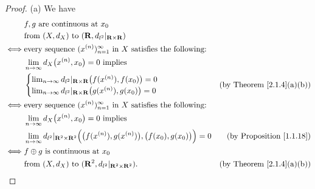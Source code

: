 \begin{proof}{(a)}
    We have
    \begin{align*}
             & f, g \text{ are continuous at } x_0                                                                                                                                             \\
             & \text{from } (X, d_X) \text{ to } (\mathbf{R}, d_{l^2}|_{\mathbf{R} \times \mathbf{R}})                                                                                         \\
        \iff & \text{every sequence } (x^{(n)})_{n = 1}^\infty \text{ in } X \text{ satisfies the following:}                                                                                  \\
             & \lim_{n \to \infty} d_X\big(x^{(n)}, x_0\big) = 0 \text{ implies }                                                                                                              \\
             & \begin{cases}
            \lim_{n \to \infty} d_{l^2}|_{\mathbf{R} \times \mathbf{R}}\big(f(x^{(n)}), f(x_0)\big) = 0 \\
            \lim_{n \to \infty} d_{l^2}|_{\mathbf{R} \times \mathbf{R}}\big(g(x^{(n)}), g(x_0)\big) = 0
        \end{cases}                                                                                                               & \text{(by Theorem \ref{2.1.4}(a)(b))} \\
        \iff & \text{every sequence } (x^{(n)})_{n = 1}^\infty \text{ in } X \text{ satisfies the following:}                                                                                  \\
             & \lim_{n \to \infty} d_X\big(x^{(n)}, x_0\big) = 0 \text{ implies }                                                                                                              \\
             & \lim_{n \to \infty} d_{l^2}|_{\mathbf{R}^2 \times \mathbf{R}^2}\Big(\big(f(x^{(n)}), g(x^{(n)})\big), \big(f(x_0), g(x_0)\big)\Big) = 0 & \text{(by Proposition \ref{1.1.18})}  \\
        \iff & f \oplus g \text{ is continuous at } x_0                                                                                                                                        \\
             & \text{from } (X, d_X) \text{ to } (\mathbf{R}^2, d_{l^2}|_{\mathbf{R}^2 \times \mathbf{R}^2}).                                          & \text{(by Theorem \ref{2.1.4}(a)(b))}
    \end{align*}
\end{proof}

